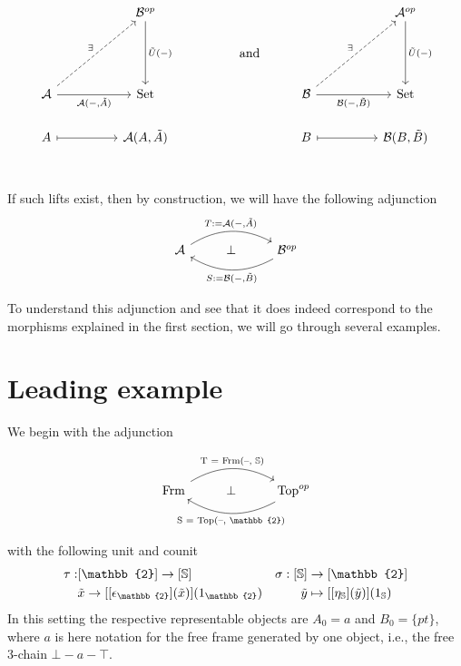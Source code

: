 \documentclass[12pt,a4paper]{article}
\DeclareMathOperator{\Hom}{Hom}
\DeclareMathOperator{\Set}{Set}
\DeclareMathOperator{\Frm}{Frm}
\DeclareMathOperator{\Top}{Top}
\def\HomA{\ensuremath\mathcal{A}}
\def\HomB{\ensuremath\mathcal{B}}
\def\t{\ensuremath\tilde}
\begin{document}
\[\begin{tikzcd}
	&& {\mathcal{B}^{op}} &&&&& {\mathcal{A}^{op}} \\
	&& {} && {\text{and}} \\
	{\mathcal{A}} && \Set &&& {\mathcal{B}} && \Set \\
	A && {\HomA(A, \t A)} &&& B && {\HomB(B, \t B)} \\
	&&&&& {}
	\arrow["{\t U(-)}", from=1-3, to=3-3]
	\arrow["{\t U(-)}", from=1-8, to=3-8]
	\arrow["\exists", dashed, from=3-1, to=1-3]
	\arrow["{\HomA(-,\t A)}"', from=3-1, to=3-3]
	\arrow["\exists", dashed, from=3-6, to=1-8]
	\arrow["{\HomB(-,\t B)}"', from=3-6, to=3-8]
	\arrow[maps to, from=4-1, to=4-3]
	\arrow[maps to, from=4-6, to=4-8]
\end{tikzcd}\]
If such lifts exist, then by construction, we will have the following adjunction
\[\begin{tikzcd}
	{\mathcal{A}} & \bot & {\mathcal{B}^{op}}
	\arrow["{T:=\HomA(-, \t A)}",  bend left, from=1-1, to=1-3, from=1-1, to=1-3]
	\arrow["{S:=\HomB(-, \t B)}", bend left, from=1-3, to=1-1, from=1-3, to=1-1]
\end{tikzcd}\]

To understand this adjunction and see that it does indeed correspond to the morphisms explained in the first section, we will go through several examples.
\section{Leading example}

We begin with the adjunction 

\[\begin{tikzcd}
	{\Frm} & \bot & {\Top^{op}}
	\arrow["{\text{T = $\Frm$(--, $\mathbb{S}$)}}" , bend left, from=1-1, to=1-3]
	\arrow["{\text{S = $\Top$(--, $\mathbb{2}$)}}", bend left, from=1-3, to=1-1]
\end{tikzcd}\]

with the following unit and counit
\begin{align*}
	\tau:& [\mathbb{2}] \to [\mathbb{S}] & \sigma: [\mathbb{S}]&\to [\mathbb{2}]\\
	&\t x \to  [[\epsilon_{\mathbb{2}}](\t x)](1_{\mathbb{2}})&\t y &\mapsto [[\eta_{\mathbb{S}}](\t y)](1_{\mathbb{S}})
\end{align*}
In this setting  the respective representable objects are $A_0 = a$ and $B_0 = \{pt\}$, where $a$ is here  notation for the free frame generated by one object, i.e., the free 3-chain $\bot - a - \top$. 
\end{document}
